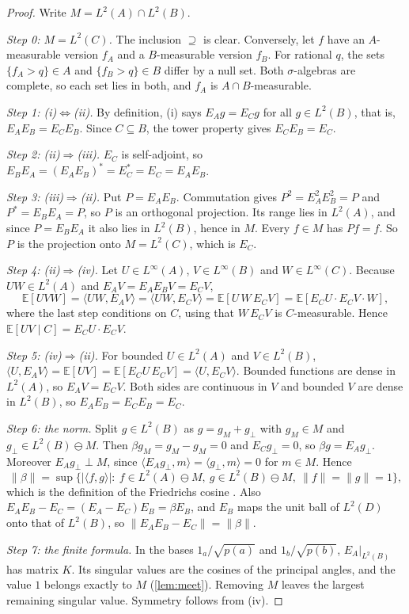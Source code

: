 \documentclass[11pt]{article}
\theoremstyle{definition}
\newcommand{\EE}{\mathbb E}
\begin{document}
\begin{proof}
Write $M=L^2(A)\cap L^2(B)$.

\emph{Step 0: $M=L^2(C)$.} The inclusion $\supseteq$ is clear. Conversely, let $f$ have an $A$-measurable version $f_A$ and a
$B$-measurable version $f_B$. For rational $q$, the sets $\{f_A>q\}\in A$ and $\{f_B>q\}\in B$ differ by a null set. Both
$\sigma$-algebras are complete, so each set lies in both, and $f_A$ is $A\cap B$-measurable.

\emph{Step 1: (i)$\Leftrightarrow$(ii).} By definition, (i) says $E_Ag=E_Cg$ for all $g\in L^2(B)$, that is, $E_AE_B=E_CE_B$. Since
$C\subseteq B$, the tower property gives $E_CE_B=E_C$.

\emph{Step 2: (ii)$\Rightarrow$(iii).} $E_C$ is self-adjoint, so $E_BE_A=(E_AE_B)^\ast=E_C^\ast=E_C=E_AE_B$.

\emph{Step 3: (iii)$\Rightarrow$(ii).} Put $P=E_AE_B$. Commutation gives $P^2=E_A^2E_B^2=P$ and $P^\ast=E_BE_A=P$, so $P$ is an
orthogonal projection. Its range lies in $L^2(A)$, and since $P=E_BE_A$ it also lies in $L^2(B)$, hence in $M$. Every $f\in M$ has
$Pf=f$. So $P$ is the projection onto $M=L^2(C)$, which is $E_C$.

\emph{Step 4: (ii)$\Rightarrow$(iv).} Let $U\in L^\infty(A)$, $V\in L^\infty(B)$ and $W\in L^\infty(C)$. Because $UW\in L^2(A)$ and
$E_AV=E_AE_BV=E_CV$,
\[
\EE[UVW]=\langle UW,E_AV\rangle=\langle UW,E_CV\rangle=\EE[U\,W\,E_CV]=\EE[E_CU\cdot E_CV\cdot W],
\]
where the last step conditions on $C$, using that $W\,E_CV$ is $C$-measurable. Hence $\EE[UV\mid C]=E_CU\cdot E_CV$.

\emph{Step 5: (iv)$\Rightarrow$(ii).} For bounded $U\in L^2(A)$ and $V\in L^2(B)$,
$\langle U,E_AV\rangle=\EE[UV]=\EE[E_CU\,E_CV]=\langle U,E_CV\rangle$. Bounded functions are dense in $L^2(A)$, so $E_AV=E_CV$. Both
sides are continuous in $V$ and bounded $V$ are dense in $L^2(B)$, so $E_AE_B=E_CE_B=E_C$.

\emph{Step 6: the norm.} Split $g\in L^2(B)$ as $g=g_M+g_\perp$ with $g_M\in M$ and $g_\perp\in L^2(B)\ominus M$. Then $\beta g_M=g_M-g_M=0$
and $E_Cg_\perp=0$, so $\beta g=E_Ag_\perp$. Moreover $E_Ag_\perp\perp M$, since $\langle E_Ag_\perp,m\rangle=\langle g_\perp,m\rangle=0$ for $m\in M$.
Hence
\[
\lVert\beta\rVert=\sup\big\{|\langle f,g\rangle|:\ f\in L^2(A)\ominus M,\ g\in L^2(B)\ominus M,\ \lVert f\rVert=\lVert g\rVert=1\big\},
\]
which is the definition of the Friedrichs cosine \cite{Deutsch2001}. Also $E_AE_B-E_C=(E_A-E_C)E_B=\beta E_B$, and $E_B$ maps the unit ball
of $L^2(D)$ onto that of $L^2(B)$, so $\lVert E_AE_B-E_C\rVert=\lVert\beta\rVert$.

\emph{Step 7: the finite formula.} In the bases $1_a/\sqrt{p(a)}$ and $1_b/\sqrt{p(b)}$, $E_A|_{L^2(B)}$ has matrix $K$. Its singular values
are the cosines of the principal angles, and the value $1$ belongs exactly to $M$ (\cref{lem:meet}). Removing $M$ leaves the largest
remaining singular value. Symmetry follows from (iv).
\end{proof}
\end{document}
